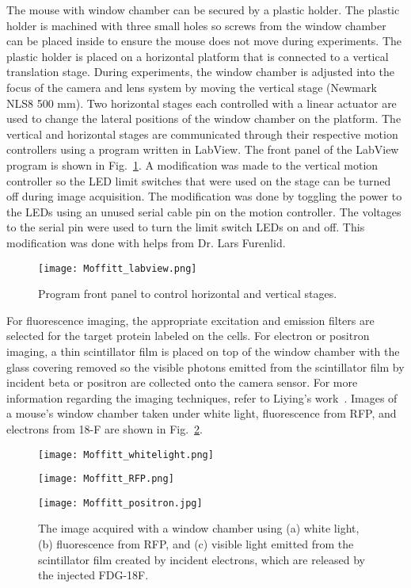 The mouse with window chamber can be secured by a plastic holder.  The plastic holder is machined with three small holes so screws from the window chamber can be placed inside to ensure the mouse does not move during experiments.  The plastic holder is placed on a horizontal platform that is connected to a vertical translation stage.  During experiments, the window chamber is adjusted into the focus of the camera and lens system by moving the vertical stage (Newmark NLS8 500 mm).  Two horizontal stages each controlled with a linear actuator are used to change the lateral positions of the window chamber on the platform.  The vertical and horizontal stages are communicated through their respective motion controllers using a program written in LabView.  The front panel of the LabView program is shown in Fig.~\ref{fig:Labview}.  A modification was made to the vertical motion controller so the LED limit switches that were used on the stage can be turned off during image acquisition.  The modification was done by toggling the power to the LEDs using an unused serial cable pin on the motion controller.  The voltages to the serial pin were used to turn the limit switch LEDs on and off.  This modification was done with helps from Dr. Lars Furenlid.

\begin{figure}
\centering
\texttt{[image: Moffitt\_labview.png]}
\caption{Program front panel to control horizontal and vertical stages.}
\label{fig:Labview}
\end{figure}

For fluorescence imaging, the appropriate excitation and emission filters are selected for the target protein labeled on the cells.  For electron or positron imaging, a thin scintillator film is placed on top of the window chamber with the glass covering removed so the visible photons emitted from the scintillator film by incident beta or positron are collected onto the camera sensor.  For more information regarding the imaging techniques, refer to Liying's work~\citep{Liying}.  Images of a mouse's window chamber taken under white light, fluorescence from RFP, and electrons from 18-F are shown in Fig.~\ref{fig:Moffitt_images}.

\begin{figure}
	\begin{minipage}{0.3\linewidth}
		\centering
		\texttt{[image: Moffitt\_whitelight.png]}
		\subcaption{}
	\end{minipage}
	\begin{minipage}{0.3\linewidth}
		\centering	
		\texttt{[image: Moffitt\_RFP.png]}
		\subcaption{}
	\end{minipage}
	\begin{minipage}{0.3\linewidth}
		\centering	
		\texttt{[image: Moffitt\_positron.jpg]}
		\subcaption{}
	\end{minipage}
	\caption{The image acquired with a window chamber using (a) white light, (b) fluorescence from RFP, and (c) visible light emitted from the scintillator film created by incident electrons, which are released by the injected FDG-18F.}
	\label{fig:Moffitt_images}
\end{figure}

